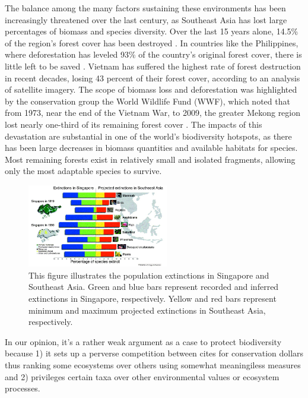  The balance among the many factors sustaining these environments has been increasingly threatened over the last century, as Southeast Asia has lost large percentages of biomass and species diversity.  Over the last 15 years alone, 14.5\% of the region's forest cover has been destroyed \citep{gullison2007tropical}.  In countries like the Philippines, where deforestation has leveled 93\% of the country's original forest cover, there is little left to be saved \citep{sodhi2004southeast}. Vietnam has suffered the highest rate of forest destruction in recent decades, losing 43 percent of their forest cover, according to an analysis of satellite imagery. The scope of biomass loss and deforestation was highlighted by the conservation group the World Wildlife Fund (WWF), which noted that from 1973, near the end of the Vietnam War, to 2009, the greater Mekong region lost nearly one-third of its remaining forest cover \citep{sunderland2012evidence}. The impacts of this devastation are substantial in one of the world's biodiversity hotspots, as there has been large decreases in biomass quantities and available habitats for species. Most remaining forests exist in relatively small and isolated fragments, allowing only the most adaptable species to survive.
 


 \begin{figure}[ht]
    \centering
        \includegraphics[width = 0.55\textwidth]{graphics/extinction.jpg}
        \caption{This figure illustrates the population extinctions in Singapore and Southeast Asia. Green and blue bars represent recorded and inferred extinctions in Singapore, respectively. Yellow and red bars represent minimum and maximum projected extinctions in Southeast Asia, respectively. \citep{sodhi2004southeast}}
    \end{figure}



In our opinion, it's a rather weak argument as a case to protect biodiversity because 1) it sets up a perverse competition between cites for conservation dollars thus ranking some ecosystems over others using somewhat meaningiless measures and 2) privileges certain taxa over other environmental values or ecosystem processes.

